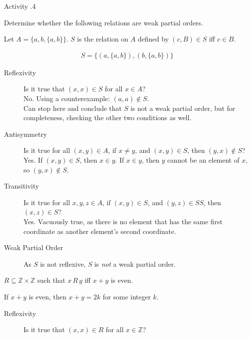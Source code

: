 \documentclass[\main/notes.tex]{subfiles}
\begin{document}
				\begin{exercise}{Activity \thechapter.4}
					\begin{questions}
					 \item Determine whether the following relations are weak partial orders.
						\begin{questions}
							\item Let $A = \bigl\{a, b, \{a, b\}\bigr\}$. $S$ is the relation on $A$ defined by $(c, B) \in S$ iff $c \in B$.
								\begin{answer}
									\begin{align*}
										S = \bigl\{(a, \{a, b\}), (b, \{a, b\})\bigr\}
									\end{align*}
									\begin{description}
										\item[Reflexivity] Is it true that $(x, x) \in S$ for all $x \in A$?\\
											No. Using a counterexample: $(a, a) \notin S$.\\
											Can stop here and conclude that $S$ is not a weak partial order, but for completeness, checking the other two conditions as well.
										\item[Antisymmetry] Is it true for all $(x, y) \in A$, if $x \neq y$, and $(x, y) \in S$, then $(y, x) \notin S$?\\
											Yes. If $(x, y) \in S$, then $x \in y$. If $x \in y$, then $y$ cannot be an element of $x$, so $(y, x) \notin S$.
										\item[Transitivity] Is it true for all $x, y, z \in A$, if $(x, y) \in S$, and $(y, z) \in SS$, then $(x, z) \in S$?\\
											Yes. Vacuously true, as there is no element that has the same first coordinate as another element's second coordinate.
										\item[Weak Partial Order] As $S$ is not reflexive, $S$ is \emph{not} a weak partial order.
									\end{description}
								\end{answer}
							\item $R \subseteq \mathbb{Z} \times \mathbb{Z}$ such that $x \, R \, y$ iff $x + y$ is even.\\
								\begin{answer}
									If $x + y$ is even, then $x + y = 2k$ for some integer $k$.
									\begin{description}
										\item[Reflexivity] Is it true that $(x, x) \in R$ for all $x \in \mathbb{Z}$?\\

\end{description}
\end{answer}
\end{questions}
\end{questions}
\end{exercise}
\end{document}
